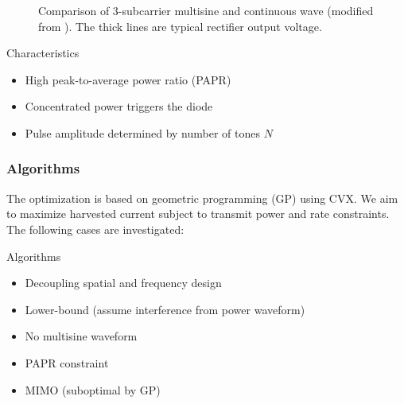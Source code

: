 \documentclass{beamer}
\begin{document}
\begin{frame}
\begin{figure}
  \caption{Comparison of 3-subcarrier multisine and continuous wave (modified from \cite{Trotter2009}). The thick lines are typical rectifier output voltage.}
  \label{fig:waveform_comparison}
\end{figure}

\begin{block}{Characteristics}
\begin{itemize}
  \item High peak-to-average power ratio (PAPR)
  \item Concentrated power triggers the diode
  \item Pulse amplitude determined by number of tones $N$
\end{itemize}
\end{block}

\end{frame}


\begin{frame}
\frametitle{Algorithms}

The optimization is based on geometric programming (GP) using CVX. We aim to maximize harvested current subject to transmit power and rate constraints. The following cases are investigated:

\begin{block}{Algorithms}
\begin{itemize}
  \item Decoupling spatial and frequency design
  \item Lower-bound (assume interference from power waveform)
  \item No multisine waveform
  \item PAPR constraint
  \item MIMO (suboptimal by GP)
\end{itemize}
\end{block}

\end{frame}
\end{document}
